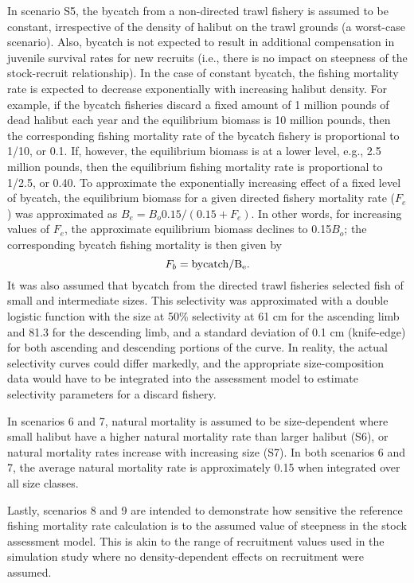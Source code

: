 In scenario S5, the bycatch from a non-directed trawl fishery is assumed to be constant, irrespective of the density of halibut on the trawl grounds (a worst-case scenario).  Also, bycatch is not expected to result in additional compensation in juvenile survival rates for new recruits (i.e., there is no impact on steepness of the stock-recruit relationship).  In the case of constant bycatch, the fishing mortality rate is expected to decrease exponentially with increasing halibut density.  For example, if the bycatch fisheries discard a fixed amount of  1 million pounds of dead halibut each year and the equilibrium biomass is 10 million pounds, then the corresponding fishing mortality rate of the bycatch fishery is proportional to 1/10, or 0.1.  If, however, the equilibrium biomass is at a lower level, e.g., 2.5 million pounds, then the equilibrium fishing mortality rate is proportional to 1/2.5, or 0.40.  To approximate the exponentially increasing effect of a fixed level of bycatch, the equilibrium biomass for a given directed fishery mortality rate ($F_e$) was approximated as $B_e = B_o 0.15/(0.15+F_e)$.  In other words, for increasing values of $F_e$, the approximate equilibrium biomass declines to 0.15$B_o$; the corresponding bycatch fishing mortality is then given by \[F_b = \rm{bycatch}/B_e.\]  It was also assumed that bycatch from the directed trawl fisheries selected fish of small and intermediate sizes.  This selectivity was approximated with a double logistic function with the size at 50\% selectivity at 61 cm for the ascending limb and 81.3 for the descending limb, and a standard deviation of 0.1 cm (knife-edge) for both ascending and descending portions of the curve.  In reality, the actual selectivity curves could differ markedly, and the appropriate size-composition data would have to be integrated into the assessment model to estimate  selectivity parameters for a discard fishery.

In scenarios 6 and 7, natural mortality is assumed to be size-dependent where small halibut have a higher natural mortality rate than larger halibut (S6), or natural mortality rates increase with increasing size (S7).  In both scenarios 6 and 7, the average natural mortality rate is approximately 0.15 when integrated over all size classes.

Lastly, scenarios 8 and 9 are intended to demonstrate how sensitive the reference fishing mortality rate calculation is to the assumed value of steepness in the stock assessment model.  This is akin to the range of recruitment values used in the \cite{clark2006assessment} simulation study where no density-dependent effects on recruitment were assumed. 


